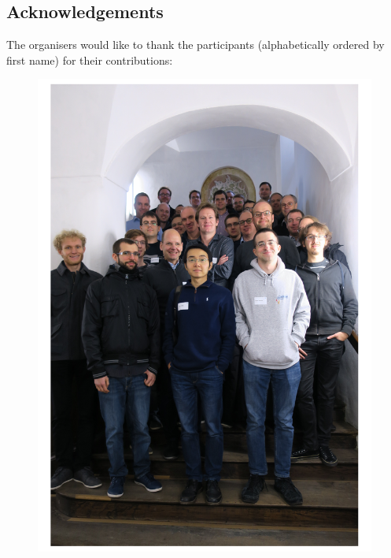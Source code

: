 \subsection*{Acknowledgements}\label{sec:acknowledgement}

  The organisers would like to thank
the participants (alphabetically ordered by first name) for their
contributions:

\begin{figure}[t!]
\includegraphics[width=1.0\linewidth]{figures/group-photo}
\end{figure}

